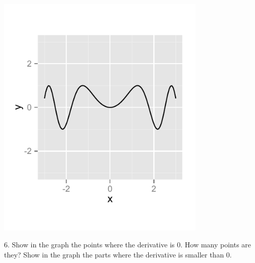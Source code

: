 \documentclass[a4paper]{report}
\begin{document}
\begin{Exercise}[title= Answer the following questions by looking at the graphs,label=ex0,difficulty=1]
\begin{minipage}{\rat\textwidth}
\includegraphics[width=0.75\textwidth]{1f.pdf}
\end{minipage}
\begin{minipage}{\rati\textwidth}
6. Show in the graph the points where the derivative is $0$. How many points are they? Show in the graph the parts where the derivative is smaller than $0$.
\end{minipage}
\end{Exercise}
\end{document}

